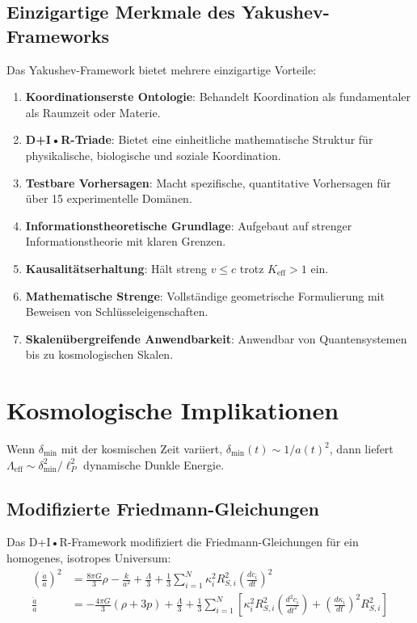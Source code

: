 \documentclass[11pt,a4paper]{article}
\begin{document}
	\subsection{Einzigartige Merkmale des Yakushev-Frameworks}
	
	Das Yakushev-Framework bietet mehrere einzigartige Vorteile:
	
	\begin{enumerate}
		\item \textbf{Koordinationserste Ontologie}: Behandelt Koordination als fundamentaler als Raumzeit oder Materie.
		
		\item \textbf{D+I•R-Triade}: Bietet eine einheitliche mathematische Struktur für physikalische, biologische und soziale Koordination.
		
		\item \textbf{Testbare Vorhersagen}: Macht spezifische, quantitative Vorhersagen für über 15 experimentelle Domänen.
		
		\item \textbf{Informationstheoretische Grundlage}: Aufgebaut auf strenger Informationstheorie mit klaren Grenzen.
		
		\item \textbf{Kausalitätserhaltung}: Hält streng $v \leq c$ trotz $K_{\mathrm{eff}} > 1$ ein.
		
		\item \textbf{Mathematische Strenge}: Vollständige geometrische Formulierung mit Beweisen von Schlüsseleigenschaften.
		
		\item \textbf{Skalenübergreifende Anwendbarkeit}: Anwendbar von Quantensystemen bis zu kosmologischen Skalen.
	\end{enumerate}
	
	\section{Kosmologische Implikationen}
	Wenn $\delta_{\min}$ mit der kosmischen Zeit variiert, $\delta_{\min}(t) \sim 1/a(t)^2$, dann liefert $\Lambda_{\text{eff}} \sim \delta_{\min}^2/\ell_P^2$ dynamische Dunkle Energie.
	\subsection{Modifizierte Friedmann-Gleichungen}
	
	Das D+I•R-Framework modifiziert die Friedmann-Gleichungen für ein homogenes, isotropes Universum:
	\begin{align}
		\left(\frac{\dot{a}}{a}\right)^2 &= \frac{8\pi G}{3}\rho - \frac{k}{a^2} + \frac{\Lambda}{3} + \frac{1}{3}\sum_{i=1}^N \kappa_i^2 R_{S,i}^2 \left(\frac{dc_i}{dt}\right)^2 \\
		\frac{\ddot{a}}{a} &= -\frac{4\pi G}{3}(\rho + 3p) + \frac{\Lambda}{3} + \frac{1}{3}\sum_{i=1}^N \left[ \kappa_i^2 R_{S,i}^2 \left(\frac{d^2c_i}{dt^2}\right) + \left(\frac{d\kappa_i}{dt}\right)^2 R_{S,i}^2 \right]
	\end{align}
	
\end{document}
